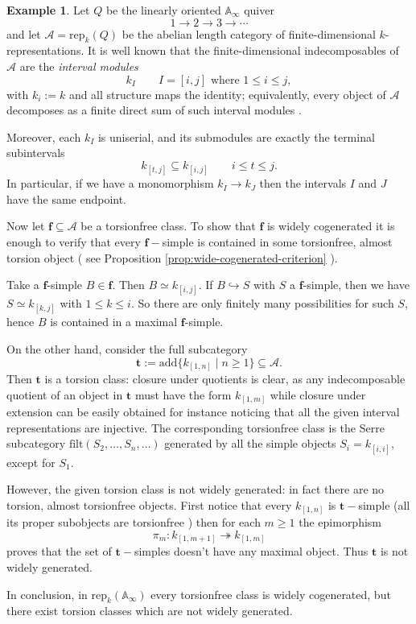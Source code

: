 \documentclass[11pt]{amsart}
\theoremstyle{definition}
\newtheorem{example}[theorem]{Example}
\newcommand{\A}{\mathcal A}
\begin{document}
\begin{example}
Let $Q$ be the linearly oriented $ \mathbb{A}_\infty $ quiver
\[
1 \to 2 \to 3 \to \cdots
\]
and let $\mathcal{A} = \mathrm{rep}_k(Q)$ be the abelian length category of finite-dimensional $k$-representations.
It is well known that the finite-dimensional indecomposables of $\mathcal{A}$ are the \emph{interval modules}
\[
k_I \qquad I =  [i, j] \text{ where }1 \le i \le j,
\]
with \( k_i := k \) and all structure maps the identity; equivalently, every object of $\mathcal{A}$ decomposes as a finite direct sum of such interval modules \cite[Theorem 1.1]{CrawleyBoevey}.

Moreover, each $k_I$ is uniserial, and its submodules are exactly the terminal subintervals
\[
k_{[t,j]} \subseteq k_{[i,j]} \qquad i \le t \le j.
\]
In particular, if we have a monomorphism \( k_I \to k_J \) then the intervals \( I \) and \( J\) have the same endpoint.

Now let $\mathbf{f}\subseteq \mathcal{A}$ be a torsionfree class. To show that $ \mathbf{f} $ is widely cogenerated it is enough to verify that every $ \mathbf{f}-$simple is contained in some torsionfree, almost torsion object ( see Proposition \ref{prop:wide-cogenerated-criterion} ).

Take a $\mathbf{f}$-simple $B\in\mathbf{f}$.
Then $B\simeq k_{[i,j]}$. If $B\hookrightarrow S$ with $S$ a $\mathbf{f}$-simple, then  we have $S\simeq k_{[k,j]}$ with $1\le k\le i$.
So there are only finitely many possibilities for such $S$, hence $B$ is contained in a maximal $\mathbf{f}$-simple.

On the other hand, consider the full subcategory
\[
\mathbf{t} := \mathrm{add}\{ k_{[1,n]} \mid n\ge 1\} \subseteq \A.
\]
Then $\mathbf{t}$ is a torsion class: closure under quotients is clear, as any indecomposable quotient of an object in \( \mathbf{t} \) must have the form \( k_{[1,m]} \) while closure under extension can be easily obtained for instance noticing that all the given interval representations are injective.  The corresponding torsionfree class is the Serre subcategory $ \mathrm{filt}( S_2, \dots, S_n, \dots) $ generated by all the simple objects \( S_i = k_{[i, i]} \), except for \( S_1 \).

However, the given torsion class is not widely generated: in fact there are no torsion, almost torsionfree objects. First notice that every \( k_{[1, n]} \) is \( \mathbf{t}-\)simple (all its proper subobjects are torsionfree ) then for each $m\ge 1$ the epimorphism
\[
\pi_m\colon k_{[1,m+1]} \twoheadrightarrow k_{[1,m]}
\]
proves that the set of \(\mathbf{t}-\)simples doesn't have any maximal object.
Thus $\mathbf{t}$ is not widely generated.

In conclusion, in $\mathrm{rep}_k(\mathbb{A}_\infty)$ every torsionfree class is widely cogenerated, but there exist torsion classes which are not widely generated.
\end{example}
\end{document}
